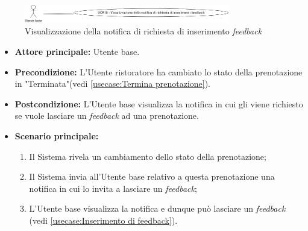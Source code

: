 \label{usecase:Visualizzazione della notifica di richiesta di inserimento feedback}

\begin{figure}[h]
	\centering
	\includegraphics[width=0.8\textwidth]{./uml/UCB15.png} 
	\caption{Visualizzazione della notifica di richiesta di inserimento \textit{feedback}}
	\label{fig:UCB17}
  \end{figure}

\begin{itemize}
	\item \textbf{Attore principale:} Utente base.


	\item \textbf{Precondizione:} L'Utente ristoratore ha cambiato lo stato della prenotazione in "Terminata"(vedi \autoref{usecase:Termina prenotazione}).


	\item \textbf{Postcondizione:} L'Utente base visualizza la notifica in cui
	      gli viene richiesto se vuole lasciare un \textit{feedback} ad una prenotazione.

	\item \textbf{Scenario principale:}
	      \begin{enumerate}
		      \item Il Sistema rivela un cambiamento dello stato della prenotazione;
		      \item Il Sistema invia all'Utente base relativo a questa prenotazione una notifica in cui lo invita a lasciare un \textit{feedback};
		      \item L'Utente base visualizza la notifica e dunque può lasciare un \textit{feedback} (vedi \autoref{usecase:Inserimento di feedback}).
	      \end{enumerate}
\end{itemize}
